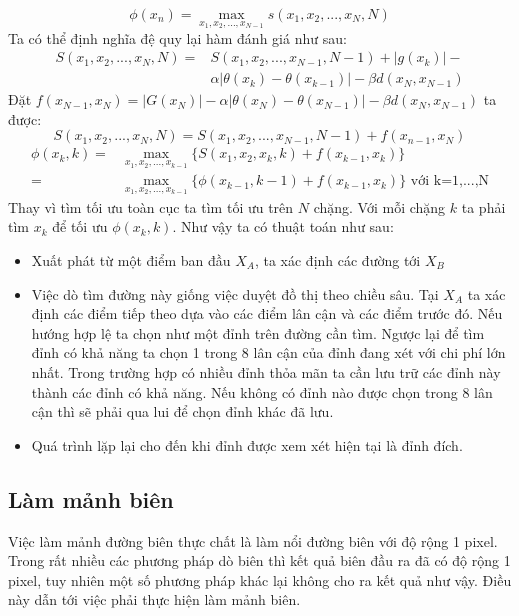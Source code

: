 \documentclass[12pt, oneside, a4paper]{book}
\begin{document}
\begin{equation*}
\phi(x_n)=\max_{x_1,x_2,...,x_{N-1}} s(x_1,x_2,..., x_N,N)
\end{equation*}
Ta có thể định nghĩa đệ quy lại hàm đánh giá như sau:
\begin{equation*}
\begin{split}
S(x_1,x_2,...,x_N,N)=&S(x_1,x_2,...,x_{N-1},N-1)+ |g(x_k)|-\\&
\alpha|\theta(x_k)-\theta(x_{k-1})|-\beta d(x_N,x_{N-1})
\end{split}
\end{equation*}
Đặt $f(x_{N-1},x_{N})=|G(x_N)|-\alpha|\theta(x_N)-\theta(x_{N-1})|-\beta d(x_N,x_{N-1})$  ta được:
\begin{equation}
 S(x_1,x_2,...,x_N,N)=S(x_1,x_2,...,x_{N-1},N-1)+f(x_{n-1},x_{N})
\end{equation}
\begin{equation*}
\begin{split}
\phi(x_k,k)=&\max_{x_1,x_2,...,x_{k-1}}\{S(x_1, x_2, x_k,k)+f(x_{k-1},x_{k})\}\\=&\max_{x_1,x_2,...,x_{k-1}}\{\phi(x_{k-1},k-1)+f(x_{k-1},x_{k})\} \text{ với k=1,...,N}
\end{split}
\end{equation*}
Thay vì tìm tối ưu toàn cục ta tìm tối ưu trên $N$ chặng. Với mỗi chặng $k$ ta phải tìm $x_k$ để tối ưu $\phi(x_k,k)$. Như vậy ta có thuật toán như sau:
\begin{itemize}
\item Xuất phát từ một điểm ban đầu $X_A$, ta xác định các đường tới $X_B$
\item Việc dò tìm đường này giống việc duyệt đồ thị theo chiều sâu. Tại $X_A$ ta xác định các điểm tiếp theo dựa vào các điểm lân cận và các điểm trước đó. Nếu hướng hợp lệ ta chọn như một đỉnh trên đường cần tìm. Ngược lại để tìm đỉnh có khả năng ta chọn 1 trong 8 lân cận của đỉnh đang xét với chi phí lớn nhất. Trong trường hợp có nhiều đỉnh thỏa mãn ta cần lưu trữ các đỉnh này thành các đỉnh có khả năng. Nếu không có đỉnh nào được chọn trong 8 lân cận thì  sẽ phải qua lui để chọn đỉnh khác đã lưu.
\item Quá trình lặp lại cho đến khi đỉnh được xem xét hiện tại là đỉnh đích.
\end{itemize}
\subsection{Làm mảnh biên}
Việc làm mảnh đường biên thực chất là làm nổi đường biên với độ rộng 1 pixel. Trong rất nhiều các phương pháp dò biên thì kết quả biên đầu ra đã có độ rộng 1 pixel, tuy nhiên một số phương pháp khác lại không cho ra kết quả như vậy. Điều này dẫn tới việc phải thực hiện làm mảnh biên.
\end{document}
